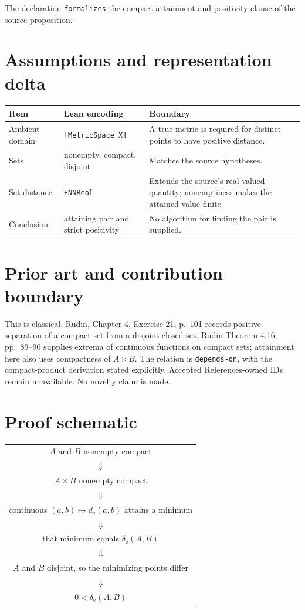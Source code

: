 \documentclass[11pt]{article}
\begin{document}
The declaration \texttt{formalizes} the compact-attainment and positivity clause of the
source proposition.

\section{Assumptions and representation delta}

\begin{tabularx}{\textwidth}{@{}l>{\raggedright\arraybackslash}X>{\raggedright\arraybackslash}X@{}}
\toprule
Item & Lean encoding & Boundary \\
\midrule
Ambient domain & \texttt{[MetricSpace X]} & A true metric is required for distinct points to have positive distance. \\
Sets & nonempty, compact, disjoint & Matches the source hypotheses. \\
Set distance & \texttt{ENNReal} & Extends the source's real-valued quantity; nonemptiness makes the attained value finite. \\
Conclusion & attaining pair and strict positivity & No algorithm for finding the pair is supplied. \\
\bottomrule
\end{tabularx}

\section{Prior art and contribution boundary}

This is classical. Rudin, Chapter 4, Exercise 21, p.~101 records positive separation of a
compact set from a disjoint closed set. Rudin Theorem 4.16, pp.~89--90 supplies extrema
of continuous functions on compact sets; attainment here also uses compactness of
$A\times B$. The relation is \texttt{depends-on}, with the compact-product derivation
stated explicitly. Accepted References-owned IDs remain unavailable. No novelty claim is
made.

\section{Proof schematic}

\begin{center}
\begin{tabular}{c}
$A$ and $B$ nonempty compact \\
$\Downarrow$ \\
$A\times B$ nonempty compact \\
$\Downarrow$ \\
continuous $(a,b)\mapsto d_{\mathrm e}(a,b)$ attains a minimum \\
$\Downarrow$ \\
that minimum equals $\delta_{\mathrm e}(A,B)$ \\
$\Downarrow$ \\
$A$ and $B$ disjoint, so the minimizing points differ \\
$\Downarrow$ \\
$0<\delta_{\mathrm e}(A,B)$
\end{tabular}
\end{center}
\end{document}
